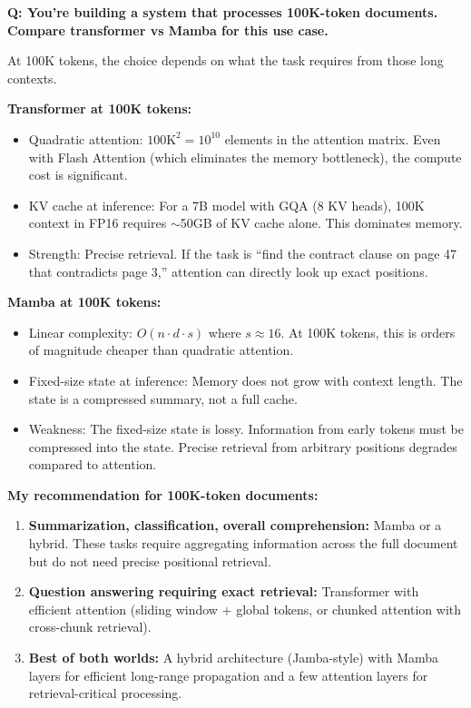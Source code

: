 \begin{interviewq}
\textbf{Q: You're building a system that processes 100K-token documents. Compare transformer vs Mamba for this use case.}

 \quad {} \quad \badgefreq{\freqmed}

\stronganswer

At 100K tokens, the choice depends on what the task requires from those long contexts.

\textbf{Transformer at 100K tokens:}
\begin{itemize}
    \item Quadratic attention: $100\text{K}^2 = 10^{10}$ elements in the attention matrix. Even with Flash Attention (which eliminates the memory bottleneck), the compute cost is significant.
    \item KV cache at inference: For a 7B model with GQA (8 KV heads), 100K context in FP16 requires $\sim$50GB of KV cache alone. This dominates memory.
    \item Strength: Precise retrieval. If the task is ``find the contract clause on page 47 that contradicts page 3,'' attention can directly look up exact positions.
\end{itemize}

\textbf{Mamba at 100K tokens:}
\begin{itemize}
    \item Linear complexity: $O(n \cdot d \cdot s)$ where $s \approx 16$. At 100K tokens, this is orders of magnitude cheaper than quadratic attention.
    \item Fixed-size state at inference: Memory does not grow with context length. The state is a compressed summary, not a full cache.
    \item Weakness: The fixed-size state is lossy. Information from early tokens must be compressed into the state. Precise retrieval from arbitrary positions degrades compared to attention.
\end{itemize}

\textbf{My recommendation for 100K-token documents:}
\begin{enumerate}
    \item \textbf{Summarization, classification, overall comprehension:} Mamba or a hybrid. These tasks require aggregating information across the full document but do not need precise positional retrieval.
    \item \textbf{Question answering requiring exact retrieval:} Transformer with efficient attention (sliding window + global tokens, or chunked attention with cross-chunk retrieval).
    \item \textbf{Best of both worlds:} A hybrid architecture (Jamba-style) with Mamba layers for efficient long-range propagation and a few attention layers for retrieval-critical processing.
\end{enumerate}


\end{interviewq}
